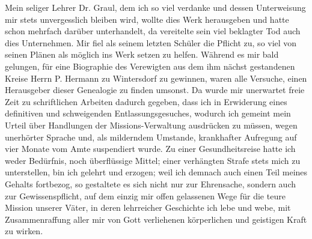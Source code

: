 \documentclass{article}
\begin{document}
Mein seliger Lehrer Dr. Graul, dem ich so viel verdanke und dessen Unterweisung mir stets unvergesslich bleiben wird, wollte dies Werk herausgeben und hatte schon mehrfach darüber unterhandelt, da vereitelte sein viel beklagter Tod auch dies Unternehmen. Mir fiel als seinem letzten Schüler die Pflicht zu, so viel von seinen Plänen als möglich ins Werk setzen zu helfen. Während es mir bald gelungen, für eine Biographie des Verewigten aus dem ihm nächst gestandenen Kreise Herrn P. Hermann zu Wintersdorf zu gewinnen, waren alle Versuche, einen Herausgeber dieser Genealogie zu finden umsonst. Da wurde mir unerwartet freie Zeit zu schriftlichen Arbeiten dadurch gegeben, dass ich in Erwiderung eines definitiven und schweigenden Entlassungsgesuches, wodurch ich gemeint mein Urteil über Handlungen der Missions-Verwaltung ausdrücken zu müssen, wegen unerhörter Sprache und, als milderndem Umstande, krankhafter Aufregung auf vier Monate vom Amte suspendiert wurde. Zu einer Gesundheitsreise hatte ich weder Bedürfnis, noch überflüssige Mittel; einer verhängten Strafe stets mich zu unterstellen, bin ich gelehrt und erzogen; weil ich demnach auch einen Teil meines Gehalts fortbezog, so gestaltete es sich nicht nur zur Ehrensache, sondern auch zur Gewissenspflicht, auf dem einzig mir offen gelassenen Wege für die teure Mission unserer Väter, in deren lehrreicher Geschichte ich lebe und webe, mit Zusammenraffung aller mir von Gott verliehenen körperlichen und geistigen Kraft zu wirken.
\end{document}
